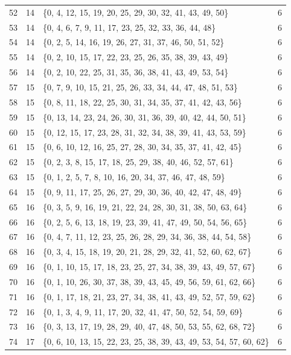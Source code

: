 \documentclass[12pt,a4paper,reqno]{amsart}
\numberwithin{equation}{section}
\theoremstyle{plain}
\theoremstyle{definition}
\begin{document}
\begin{longtable}{c|c|>{\raggedright\arraybackslash}p{}|c}
52 & 14 & \{0, 4, 12, 15, 19, 20, 25, 29, 30, 32, 41, 43, 49, 50\} & 6\\
53 & 14 & \{0, 4, 6, 7, 9, 11, 17, 23, 25, 32, 33, 36, 44, 48\} & 6\\
54 & 14 & \{0, 2, 5, 14, 16, 19, 26, 27, 31, 37, 46, 50, 51, 52\} & 6\\
55 & 14 & \{0, 2, 10, 15, 17, 22, 23, 25, 26, 35, 38, 39, 43, 49\} & 6\\
56 & 14 & \{0, 2, 10, 22, 25, 31, 35, 36, 38, 41, 43, 49, 53, 54\} & 6\\
57 & 15 & \{0, 7, 9, 10, 15, 21, 25, 26, 33, 34, 44, 47, 48, 51, 53\} & 6\\
58 & 15 & \{0, 8, 11, 18, 22, 25, 30, 31, 34, 35, 37, 41, 42, 43, 56\} & 6\\
59 & 15 & \{0, 13, 14, 23, 24, 26, 30, 31, 36, 39, 40, 42, 44, 50, 51\} & 6\\
60 & 15 & \{0, 12, 15, 17, 23, 28, 31, 32, 34, 38, 39, 41, 43, 53, 59\} & 6\\
61 & 15 & \{0, 6, 10, 12, 16, 25, 27, 28, 30, 34, 35, 37, 41, 42, 45\} & 6\\
62 & 15 & \{0, 2, 3, 8, 15, 17, 18, 25, 29, 38, 40, 46, 52, 57, 61\} & 6\\
63 & 15 & \{0, 1, 2, 5, 7, 8, 10, 16, 20, 34, 37, 46, 47, 48, 59\} & 6\\
64 & 15 & \{0, 9, 11, 17, 25, 26, 27, 29, 30, 36, 40, 42, 47, 48, 49\} & 6\\
65 & 16 & \{0, 3, 5, 9, 16, 19, 21, 22, 24, 28, 30, 31, 38, 50, 63, 64\} & 6\\
66 & 16 & \{0, 2, 5, 6, 13, 18, 19, 23, 39, 41, 47, 49, 50, 54, 56, 65\} & 6\\
67 & 16 & \{0, 4, 7, 11, 12, 23, 25, 26, 28, 29, 34, 36, 38, 44, 54, 58\} & 6\\
68 & 16 & \{0, 3, 4, 15, 18, 19, 20, 21, 28, 29, 32, 41, 52, 60, 62, 67\} & 6\\
69 & 16 & \{0, 1, 10, 15, 17, 18, 23, 25, 27, 34, 38, 39, 43, 49, 57, 67\} & 6\\
70 & 16 & \{0, 1, 10, 26, 30, 37, 38, 39, 43, 45, 49, 56, 59, 61, 62, 66\} & 6\\
71 & 16 & \{0, 1, 17, 18, 21, 23, 27, 34, 38, 41, 43, 49, 52, 57, 59, 62\} & 6\\
72 & 16 & \{0, 1, 3, 4, 9, 11, 17, 20, 32, 41, 47, 50, 52, 54, 59, 69\} & 6\\
73 & 16 & \{0, 3, 13, 17, 19, 28, 29, 40, 47, 48, 50, 53, 55, 62, 68, 72\} & 6\\
74 & 17 & \{0, 6, 10, 13, 15, 22, 23, 25, 38, 39, 43, 49, 53, 54, 57, 60, 62\} & 6\\

\end{longtable}
\end{document}
